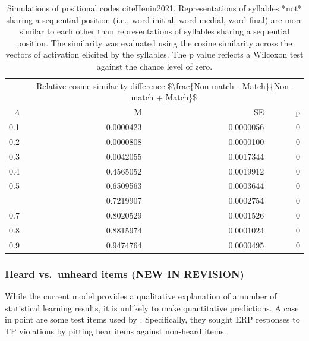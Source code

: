 \documentclass[
]{article}
\begin{document}
\begin{table}

\caption{\label{tab:basic-similarity-by-position-print-difference2}Simulations of positional codes cite{Henin2021}. Representations of syllables *not* sharing a sequential position (i.e., word-initial, word-medial, word-final) are more similar to each other than representations of syllables sharing a sequential position. The similarity was evaluated using the cosine similarity across the vectors of activation elicited by the syllables. The p value reflects a Wilcoxon test against the chance level of zero.}
\centering
\begin{tabular}[t]{rrrr}
\toprule
\multicolumn{1}{c}{ } & \multicolumn{3}{c}{Relative cosine similarity difference \$\textbackslash{}frac\{Non-match - Match\}\{Non-match + Match\}\$} \\
\cmidrule(l{3pt}r{3pt}){2-4}
$\Lambda$ & M & SE & p\\
\midrule
0.1 & 0.0000423 & 0.0000056 & 0\\
0.2 & 0.0000808 & 0.0000100 & 0\\
0.3 & 0.0042055 & 0.0017344 & 0\\
0.4 & 0.4565052 & 0.0019912 & 0\\
0.5 & 0.6509563 & 0.0003644 & 0\\
\addlinespace
0.6 & 0.7219907 & 0.0002754 & 0\\
0.7 & 0.8020529 & 0.0001526 & 0\\
0.8 & 0.8815974 & 0.0001024 & 0\\
0.9 & 0.9474764 & 0.0000495 & 0\\
\bottomrule
\end{tabular}
\end{table}

\hypertarget{heard-vs.-unheard-items-flo2022-new-in-revision}{%
\subsubsection{\texorpdfstring{Heard vs.~unheard items \citep{Flo2022}
(NEW IN
REVISION)}{Heard vs.~unheard items {[}@Flo2022{]} (NEW IN REVISION)}}\label{heard-vs.-unheard-items-flo2022-new-in-revision}}

While the current model provides a qualitative explanation of a number
of statistical learning results, it is unlikely to make quantitative
predictions. A case in point are some test items used by
\citep{Flo2022}. Specifically, they sought ERP responses to TP
violations by pitting hear items against non-heard items.
\end{document}
